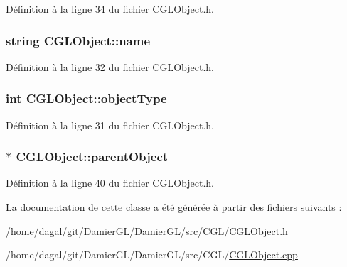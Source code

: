 Définition à la ligne 34 du fichier C\-G\-L\-Object.\-h.

\hypertarget{class_c_g_l_object_a0397e47d30fd9a5eb57cce07e4b02bce}{
\subsubsection[{name}]{\setlength{\rightskip}{0pt plus 5cm}string C\-G\-L\-Object\-::name\hspace{0.3cm}{\ttfamily [protected]}}}\label{class_c_g_l_object_a0397e47d30fd9a5eb57cce07e4b02bce}


Définition à la ligne 32 du fichier C\-G\-L\-Object.\-h.

\hypertarget{class_c_g_l_object_a5ff11ea98cb278213849d6a6f4124cdc}{
\subsubsection[{object\-Type}]{\setlength{\rightskip}{0pt plus 5cm}int C\-G\-L\-Object\-::object\-Type\hspace{0.3cm}{\ttfamily [protected]}}}\label{class_c_g_l_object_a5ff11ea98cb278213849d6a6f4124cdc}


Définition à la ligne 31 du fichier C\-G\-L\-Object.\-h.

\hypertarget{class_c_g_l_object_a445899f0f0a263df4780ccf75103c2a9}{
\subsubsection[{parent\-Object}]{$\ast$ C\-G\-L\-Object\-::parent\-Object\hspace{0.3cm}{\ttfamily [protected]}}}\label{class_c_g_l_object_a445899f0f0a263df4780ccf75103c2a9}


Définition à la ligne 40 du fichier C\-G\-L\-Object.\-h.



La documentation de cette classe a été générée à partir des fichiers suivants \-:\begin{DoxyCompactItemize}
\item 
/home/dagal/git/\-Damier\-G\-L/\-Damier\-G\-L/src/\-C\-G\-L/\hyperlink{_c_g_l_object_8h}{C\-G\-L\-Object.\-h}\item 
/home/dagal/git/\-Damier\-G\-L/\-Damier\-G\-L/src/\-C\-G\-L/\hyperlink{_c_g_l_object_8cpp}{C\-G\-L\-Object.\-cpp}\end{DoxyCompactItemize}

